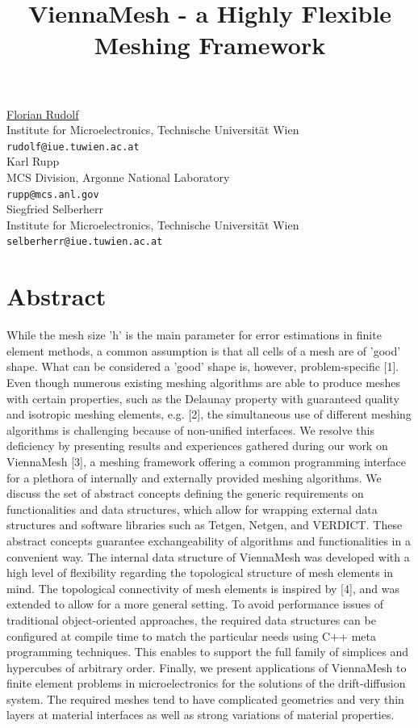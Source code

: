 \documentclass[article, A4, 11pt]{llncs}%
\begin{document}
\title{ViennaMesh - a Highly Flexible Meshing Framework}
 \author{} \institute{}
\maketitle
\begin{center}
{\large \underline{Florian Rudolf}}\\
Institute for Microelectronics, Technische Universität Wien\\
{\tt rudolf@iue.tuwien.ac.at}
\\ \vspace{4mm}
{\large Karl Rupp}\\
MCS Division, Argonne National Laboratory\\
{\tt rupp@mcs.anl.gov}
\\ \vspace{4mm}
{\large Siegfried Selberherr}\\
Institute for Microelectronics, Technische Universität Wien\\
{\tt selberherr@iue.tuwien.ac.at}
\end{center}

\section*{Abstract}
While the mesh size 'h' is the main parameter for error estimations in finite element methods, a common assumption is that all cells of a mesh are of 'good' shape. What can be considered a 'good' shape is, however, problem-specific [1]. Even though numerous existing meshing algorithms are able to produce meshes with certain properties, such as the Delaunay property with guaranteed quality and isotropic meshing elements, e.g. [2], the simultaneous use of different meshing algorithms is challenging because of non-unified interfaces. We resolve this deficiency by presenting results and experiences gathered during our work on ViennaMesh [3], a meshing framework offering a common programming interface for a plethora of internally and externally provided meshing algorithms. We discuss the set of abstract concepts defining the generic requirements on functionalities and data structures, which allow for wrapping external data structures and software libraries such as Tetgen, Netgen, and VERDICT. These abstract concepts guarantee exchangeability of algorithms and functionalities in a convenient way. The internal data structure of ViennaMesh was developed with a high level of flexibility regarding the topological structure of mesh elements in mind. The topological connectivity of mesh elements is inspired by [4], and was extended to allow for a more general setting. To avoid performance issues of traditional object-oriented approaches, the required data structures can be configured at compile time to match the particular needs using C++ meta programming techniques. This enables to support the full family of simplices and hypercubes of arbitrary order. Finally, we present applications of ViennaMesh to finite element problems in microelectronics for the solutions of the drift-diffusion system. The required meshes tend to have complicated geometries and very thin layers at material interfaces as well as strong variations of material properties.
\end{document}
